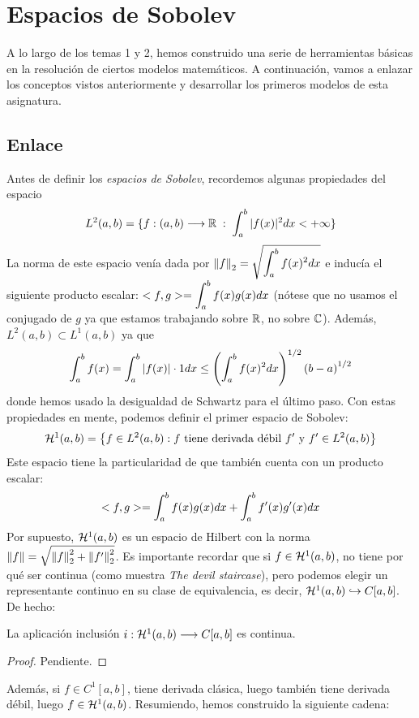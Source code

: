 \chapter{Espacios de Sobolev}

A lo largo de los temas 1 y 2, hemos construido una serie de herramientas básicas en la resolución de ciertos modelos matemáticos. A continuación, vamos a enlazar los conceptos vistos anteriormente y desarrollar los primeros modelos de esta asignatura.

\section{Enlace}

Antes de definir los \textit{espacios de Sobolev}, recordemos algunas propiedades del espacio 
\[L^2(a,b)=\displaystyle\{f : (a,b) \longrightarrow \mathbb{R}\;:\; \displaystyle\int_{ a }^{ b } |f(x)|^2dx<+\infty\displaystyle\}\]
La norma de este espacio venía dada por $\left\lVert f\right\rVert_2=\sqrt{\displaystyle\int_{ a }^{ b } f(x)^2dx}$ e inducía el siguiente producto escalar: $<f,g>=\displaystyle\int_{ a }^{ b } f(x)g(x)dx$ (nótese que no usamos el conjugado de $g$ ya que estamos trabajando sobre $\mathbb{R}$, no sobre $\mathbb{C}$). Además, $L^2(a,b)\subset L^1(a,b)$ ya que 
\[
\displaystyle\int_{ a }^{ b } f(x)=\displaystyle\int_{ a }^{ b } |f(x)|\cdot 1dx\leq \left(\displaystyle\int_{ a }^{ b } f(x)^2dx\right)^{1/2}\left(b-a\right)^{1/2}
\]
donde hemos usado la desigualdad de Schwartz para el último paso. Con estas propiedades en mente, podemos definir el primer espacio de Sobolev:
\[
\mathcal{H}^{ 1 }(a,b)=\left\{ f\in L^{ 2 }(a,b): f \text{ tiene derivada débil }f' \text{ y } f'\in L^{ 2 }(a,b) \right\}
\]
Este espacio tiene la particularidad de que también cuenta con un producto escalar:
\[
<f,g>=\displaystyle\int_{ a }^{ b } f(x)g(x)dx+\displaystyle\int_{ a }^{ b } f'(x)g'(x)dx
\]
Por supuesto, $\mathcal{H}^{ 1 }(a,b)$ es un espacio de Hilbert con la norma $\left\lVert f\right\rVert=\sqrt{\left\lVert f\right\rVert^2_2+\left\lVert f'\right\rVert_2^2}$. Es importante recordar que si $f\in\mathcal{H}^{ 1 }(a,b)$, no tiene por qué ser continua (como muestra \textit{The devil staircase}), pero podemos elegir un representante continuo en su clase de equivalencia, es decir, $\mathcal{H}^{ 1 }(a,b)\hookrightarrow C[a,b]$. De hecho:
\begin{prop}\label{inclusion continua}
La aplicación inclusión $i : \mathcal{H}^{ 1 }(a,b) \longrightarrow C[a,b]$ es continua.
\end{prop}
\begin{proof}
Pendiente.
\end{proof}
Además, si $f\in C^1[a,b]$, tiene derivada clásica, luego también tiene derivada débil, luego $f\in\mathcal{H}^{ 1 }(a,b)$. Resumiendo, hemos construido la siguiente cadena:
